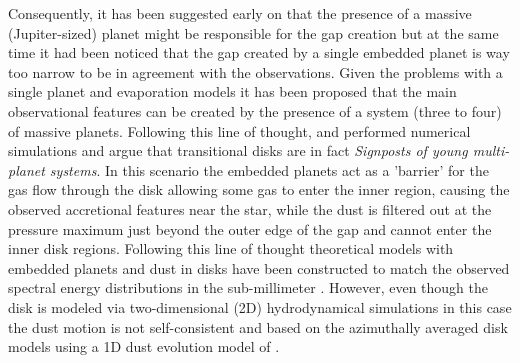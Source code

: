 \documentclass[10pt,fleqn,twoside]{article}
\begin{document}
Consequently, it has been suggested early on that the presence of a massive (Jupiter-sized) planet might be responsible for the
gap creation \citep{2006ApJ...640.1110V,2006MNRAS.373.1619R}
but at the same time it had been noticed that the gap created
by a single embedded planet is way too narrow to be in agreement with the observations.
Given the problems with a single planet and evaporation models it has been proposed that the main observational
features can be created by the presence of a system (three to four) of massive planets.
Following this line of thought, \citet{2011ApJ...729...47Z}
and \citet{2011ApJ...738..131D}
performed numerical simulations and argue that transitional disks are in fact {\itshape Signposts of young multi-planet systems}.
In this scenario the embedded planets act as a 'barrier' for the gas flow through the disk allowing some
gas to enter the inner region, causing the observed accretional features near the star, while the dust
is filtered out at the pressure maximum just beyond the outer edge of the gap and cannot enter the inner disk regions.
Following this line of thought theoretical models with embedded planets and dust in disks
have been constructed to match the observed spectral energy distributions in the sub-millimeter
\citep{2013A&A...560A.111D,2015A&A...573A...9P}. However, even though the disk is modeled via
two-dimensional (2D) hydrodynamical simulations in this case the dust motion is not 
self-consistent and based on the azimuthally averaged
disk models using a 1D dust evolution model of \citet{2010A&A...513A..79B}.
\end{document}
